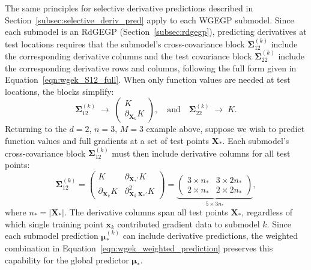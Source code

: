 \documentclass[12pt]{article}
\begin{document}
The same principles for selective derivative predictions described in Section~\ref{subsec:selective_deriv_pred} apply to each WGEGP submodel. Since each submodel is an RdGEGP (Section~\ref{subsec:rdgegp}), predicting derivatives at test locations requires that the submodel's cross-covariance block $\boldsymbol{\Sigma}_{12}^{(k)}$ include the corresponding derivative columns and the test covariance block $\boldsymbol{\Sigma}_{22}^{(k)}$ include the corresponding derivative rows and columns, following the full form given in Equation~\eqref{eqn:wgek_S12_full}. When only function values are needed at test locations, the blocks simplify:
\begin{equation}
	\boldsymbol{\Sigma}_{12}^{(k)} \;\longrightarrow\;
	\begin{pmatrix}
		K \\
		\partial_{\mathbf{X}_k} K
	\end{pmatrix}, \quad \text{and} \quad
	\boldsymbol{\Sigma}_{22}^{(k)} \;\longrightarrow\; K.
\end{equation}
Returning to the $d = 2$, $n = 3$, $M = 3$ example above, suppose we wish to predict function values and full gradients at a set of test points $\mathbf{X}_*$. Each submodel's cross-covariance block $\boldsymbol{\Sigma}_{12}^{(k)}$ must then include derivative columns for all test points:
\begin{equation}
	\label{eqn:wgegp_S12_2d}
	\boldsymbol{\Sigma}_{12}^{(k)} =
	\begin{pmatrix}
		K & \partial_{\mathbf{X}_*'} K \\
		\partial_{\mathbf{X}_k} K & \partial^2_{\mathbf{X}_k\,\mathbf{X}_*'} K
	\end{pmatrix}
	=
	\underbrace{\begin{pmatrix}
		\text{$3 \times n_*$} & \text{$3 \times 2n_*$} \\
		\text{$2 \times n_*$} & \text{$2 \times 2n_*$}
	\end{pmatrix}}_{\text{$5 \times 3n_*$}},
\end{equation}
where $n_* = |\mathbf{X}_*|$. The derivative columns span all test points $\mathbf{X}_*$, regardless of which single training point $\mathbf{x}_k$ contributed gradient data to submodel $k$. Since each submodel prediction $\boldsymbol{\mu}_*^{(k)}$ can include derivative predictions, the weighted combination in Equation~\eqref{eqn:wgek_weighted_prediction} preserves this capability for the global predictor $\boldsymbol{\mu}_*$.

\end{document}
